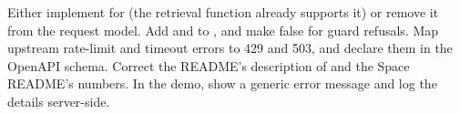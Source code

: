 \begin{recommended}
Either implement  for  (the retrieval function already supports it) or remove it from the request model. Add  and  to , and make  false for guard refusals. Map upstream rate-limit and timeout errors to 429 and 503, and declare them in the OpenAPI schema. Correct the README's description of  and the Space README's numbers. In the demo, show a generic error message and log the details server-side.
\end{recommended}
